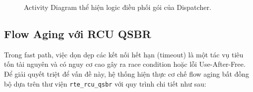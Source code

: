 \documentclass[12pt,a4paper,twoside]{report}
\begin{document}
\begin{figure}[htbp]
{
    }
    \caption{Activity Diagram thể hiện logic điều phối gói của Dispatcher.}
    \label{fig:activity_diag}
\end{figure}


\subsection{Flow Aging với RCU QSBR}
Trong fast path, việc dọn dẹp các kết nối hết hạn (timeout) là một tác vụ tiêu tốn tài nguyên và có nguy cơ cao gây ra race condition hoặc lỗi Use-After-Free. Để giải quyết triệt để vấn đề này, hệ thống hiện thực cơ chế flow aging bất đồng bộ dựa trên thư viện \texttt{rte\_rcu\_qsbr} với quy trình chi tiết như sau:
\end{document}
